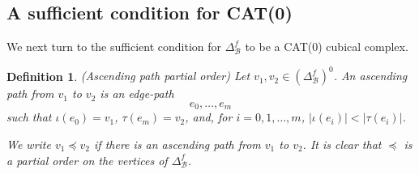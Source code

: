 \documentclass{amsart}
\newtheorem{Definition}[theorem]{Definition}
\newtheorem{standing assumption}[theorem]{Standing Assumption}
\newenvironment{definition}{\begin{Definition}\normalfont}{\end{Definition}}
\begin{document}



\subsection{A sufficient condition for CAT(0)}

We next turn to the sufficient condition for $\Delta^{f}_{\mathcal{B}}$ to be a CAT(0) cubical complex.

\begin{definition} (Ascending path partial order) \label{definition:ascending}
Let $v_{1}, v_{2} \in \left(\Delta^{f}_{\mathcal{B}}\right)^{0}$. An 
\emph{ascending path from $v_{1}$ to $v_{2}$} is an edge-path
\[ e_{0}, \ldots, e_{m} \]
such that $\iota(e_{0}) = v_{1}$, $\tau(e_{m}) = v_{2}$, and, for $i=0,1, \ldots, m$,
$|\iota(e_{i})| < |\tau(e_{i})|$.

We write $v_{1} \preceq v_{2}$ if there is an ascending path from $v_{1}$ to $v_{2}$.
It is clear that $\preceq$ is a partial order on the vertices of $\Delta^{f}_{\mathcal{B}}$.
\end{definition}
\end{document}
